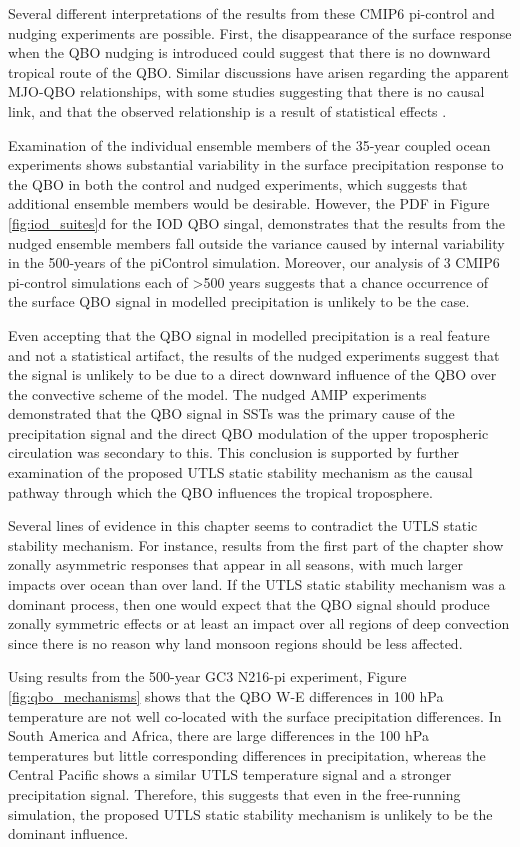 Several different interpretations of the results from these CMIP6 pi-control and nudging experiments are possible. First, the disappearance of the surface response when the QBO nudging is introduced could suggest that there is no downward tropical route of the QBO. Similar discussions have arisen regarding the apparent MJO-QBO relationships, with some studies suggesting that there is no causal link, and that the observed relationship is a result of statistical effects \citep{wang2019}. 

Examination of the individual ensemble members of the 35-year coupled ocean experiments shows substantial variability in the surface precipitation response to the QBO in both the control and nudged experiments, which suggests that additional ensemble members would be desirable. However, the PDF in Figure \ref{fig:iod_suites}d for the IOD QBO singal, demonstrates that the results from the nudged ensemble members fall outside the variance caused by internal variability in the 500-years of the piControl simulation. Moreover, our analysis of 3 CMIP6 pi-control simulations each of >500 years suggests that a chance occurrence of the surface QBO signal in modelled precipitation is unlikely to be the case.  

Even accepting that the QBO signal in modelled precipitation is a real feature and not a statistical artifact, the results of the nudged experiments suggest that the signal is unlikely to be due to a direct downward influence of the QBO over the convective scheme of the model. The nudged AMIP experiments demonstrated that the QBO signal in SSTs was the primary cause of the precipitation signal and the direct QBO modulation of the upper tropospheric circulation was secondary to this. This conclusion is supported by further examination of the proposed UTLS static stability mechanism as 
the causal pathway through which the QBO influences the tropical troposphere.

 Several lines of evidence in this chapter seems to contradict the UTLS static stability mechanism. For instance, results from the first part of the chapter show zonally asymmetric responses that appear in all seasons, with much larger impacts over ocean than over land.  If the UTLS static stability mechanism was a dominant process, then one would expect that the QBO signal should produce zonally symmetric effects or at least an impact over all regions of deep convection since there is no reason why land monsoon regions 
should be less affected. 

Using results from the 500-year GC3 N216-pi  experiment, Figure \ref{fig:qbo_mechanisms} shows that the QBO W-E differences in 100 hPa temperature are not well co-located with the surface precipitation differences. In South America and Africa, there are large differences in the 100 hPa temperatures but little corresponding differences in precipitation, whereas the Central Pacific shows a similar UTLS temperature signal and a stronger precipitation signal. Therefore, this suggests that even in the free-running simulation, the proposed UTLS static stability mechanism is unlikely to be the dominant influence. 

